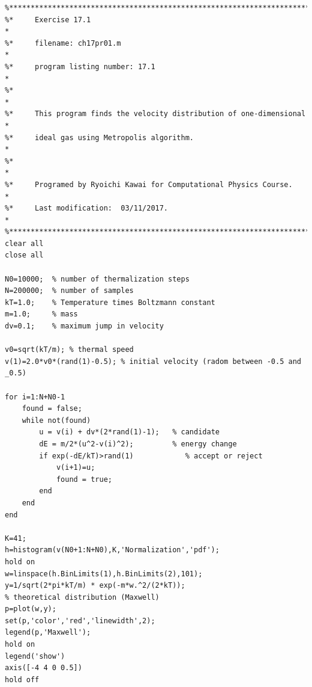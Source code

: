 \noindent
\program
\label{prog:maxwell_metropolis}
\footnotesize
\begin{verbatim}
%**************************************************************************
%*     Exercise 17.1                                                      *
%*     filename: ch17pr01.m                                               *
%*     program listing number: 17.1                                       *
%*                                                                        *
%*     This program finds the velocity distribution of one-dimensional    *
%*     ideal gas using Metropolis algorithm.                              *
%*                                                                        *
%*     Programed by Ryoichi Kawai for Computational Physics Course.       *
%*     Last modification:  03/11/2017.                                    *
%**************************************************************************
clear all
close all

N0=10000;  % number of thermalization steps
N=200000;  % number of samples
kT=1.0;    % Temperature times Boltzmann constant
m=1.0;     % mass
dv=0.1;    % maximum jump in velocity

v0=sqrt(kT/m); % thermal speed
v(1)=2.0*v0*(rand(1)-0.5); % initial velocity (radom between -0.5 and _0.5)

for i=1:N+N0-1
    found = false;
    while not(found)
        u = v(i) + dv*(2*rand(1)-1);   % candidate
        dE = m/2*(u^2-v(i)^2);         % energy change
        if exp(-dE/kT)>rand(1)            % accept or reject
            v(i+1)=u;
            found = true;
        end
    end
end

K=41;
h=histogram(v(N0+1:N+N0),K,'Normalization','pdf');
hold on
w=linspace(h.BinLimits(1),h.BinLimits(2),101);
y=1/sqrt(2*pi*kT/m) * exp(-m*w.^2/(2*kT));
% theoretical distribution (Maxwell)
p=plot(w,y);
set(p,'color','red','linewidth',2);
legend(p,'Maxwell');
hold on
legend('show')
axis([-4 4 0 0.5])
hold off
\end{verbatim}
\normalsize


